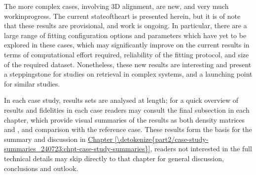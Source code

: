 \documentclass[letterpaper,table,10pt,english]{jupyterBook}
\begin{document}
\sphinxAtStartPar
The more complex cases, involving 3D alignment, are new, and very much work\sphinxhyphen{}in\sphinxhyphen{}progress. The current state\sphinxhyphen{}of\sphinxhyphen{}the\sphinxhyphen{}art is presented herein, but it is of note that these results are provisional, and work is ongoing. In particular, there are a large range of fitting configuration options and parameters which have yet to be explored in these cases, which may significantly improve on the current results in terms of computational effort required, reliability of the fitting protocol, and size of the required dataset. Nonetheless, these new results are interesting and present a stepping\sphinxhyphen{}stone for studies on {\hyperref[\detokenize{backmatter/glossary:term-radial-matrix-elements}]{}} retrieval in complex systems, and a launching point for similar studies.

\sphinxAtStartPar
{}

\sphinxAtStartPar
In each case study, {\hyperref[\detokenize{backmatter/glossary:term-bootstrap-retrieval-protocol}]{}} results sets are analysed at length; for a quick overview of results and fidelities in each case readers may consult the final subsection in each chapter, which provide visual summaries of the results as both density matrices and {\hyperref[\detokenize{backmatter/glossary:term-MF}]{}}, and comparison with the reference case. These results form the basis for the summary and discussion in \hyperref[\detokenize{part2/case-study-summaries_240723:chpt-case-study-summaries}]{Chapter \ref{\detokenize{part2/case-study-summaries_240723:chpt-case-study-summaries}}}, readers not interested in the full technical details may skip directly to that chapter for general discussion, conclusions and outlook.
\end{document}
